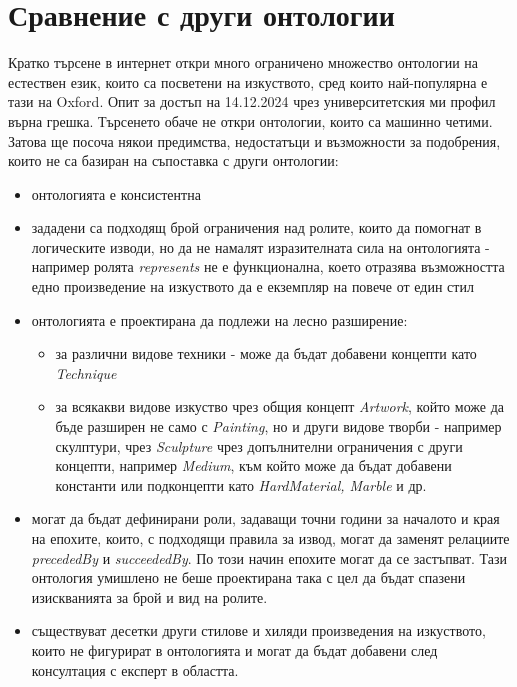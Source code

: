 \documentclass[a4paper, 11pt]{article}
\begin{document}
\section*{Сравнение с други онтологии}
Кратко търсене в интернет откри много ограничено множество онтологии на естествен език, които са посветени на изкуството, сред които най-популярна е тази на Oxford\cite{Davies2009-hf}. Опит за достъп на 14.12.2024 чрез университетския ми профил върна грешка. 
\newline
Търсенето обаче не откри онтологии, които са машинно четими. Затова ще посоча някои предимства, недостатъци и възможности за подобрения, които не са базиран на съпоставка с други онтологии:
\begin{itemize}
  \item онтологията е консистентна
  \item зададени са подходящ брой ограничения над ролите, които да помогнат в логическите изводи, но да не намалят изразителната сила на онтологията - например ролята \emph{represents} не е функционална, което отразява възможността едно произведение на изкуството да е екземпляр на повече от един стил
  \item онтологията е проектирана да подлежи на лесно разширение:
  \begin{itemize}
    \item за различни видове техники - може да бъдат добавени концепти като \emph{Technique}
    \item за всякакви видове изкуство чрез общия концепт \emph{Artwork}, който може да бъде разширен не само с \emph{Painting}, но и други видове творби - например скулптури, чрез \emph{Sculpture} чрез допълнителни ограничения с други концепти, например \emph{Medium}, към който може да бъдат добавени константи или подконцепти като \emph{HardMaterial, Marble} и др.
  \end{itemize}
  \item могат да бъдат дефинирани роли, задаващи точни години за началото и края на епохите, които, с подходящи правила за извод, могат да заменят релациите \emph{precededBy} и \emph{succeededBy}. По този начин епохите могат да се застъпват. Тази онтология умишлено не беше проектирана така с цел да бъдат спазени изискванията за брой и вид на ролите.
  \item съществуват десетки други стилове и хиляди произведения на изкуството, които не фигурират в онтологията и могат да бъдат добавени след консултация с експерт в областта. 
\end{itemize}
\nocite{wikipediaCampbellsSoup,wikipediaGirlWith,wikipediaMonaLisa,wikipediaPortraitChalk,wikipediaThird1808,wikipediaHaystacksMonet,wikipediaStarryNight,wikipediaPeriodsWestern,wikipediaVisualArts,studiobinderHistoryTimeline}
\printbibliography
\end{document}
